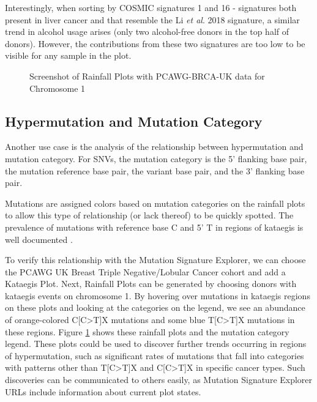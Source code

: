 \documentclass[12pt, letterpaper]{article}
\begin{document}
Interestingly, when sorting by COSMIC signatures 1 and 16 - signatures both present in liver cancer and that resemble the Li \textit{et al}. 2018 signature, a similar trend in alcohol usage arises (only two alcohol-free donors in the top half of donors).
However, the contributions from these two signatures are too low to be visible for any sample in the plot.
\begin{figure}
    \centering
    \caption{Screenshot of Rainfall Plots with PCAWG-BRCA-UK data for Chromosome 1}
    \label{fig:caseStudy2}
\end{figure}
\subsection{Hypermutation and Mutation Category}
Another use case is the analysis of the relationship between hypermutation and mutation category.
For SNVs, the mutation category is the 5' flanking base pair, the mutation reference base pair, the variant base pair, and the 3' flanking base pair.

Mutations are assigned colors based on mutation categories on the rainfall plots to allow this type of relationship (or lack thereof) to be quickly spotted.
The prevalence of mutations with reference base C and 5' T in regions of kataegis is well documented \cite{taylor2013dna}.

To verify this relationship with the Mutation Signature Explorer, we can choose the PCAWG UK Breast Triple Negative/Lobular Cancer cohort and add a Kataegis Plot.
Next, Rainfall Plots can be generated by choosing donors with kataegis events on chromosome 1.
By hovering over mutations in kataegis regions on these plots and looking at the categories on the legend, we see an abundance of orange-colored C[C\textgreater T]X mutations and some blue T[C\textgreater T]X mutations in these regions.
Figure \ref{fig:caseStudy2} shows these rainfall plots and the mutation category legend.
These plots could be used to discover further trends occurring in regions of hypermutation, such as significant rates of mutations that fall into categories with patterns other than T[C\textgreater T]X and C[C\textgreater T]X in specific cancer types.
Such discoveries can be communicated to others easily, as Mutation Signature Explorer URLs include information about current plot states.
\end{document}

